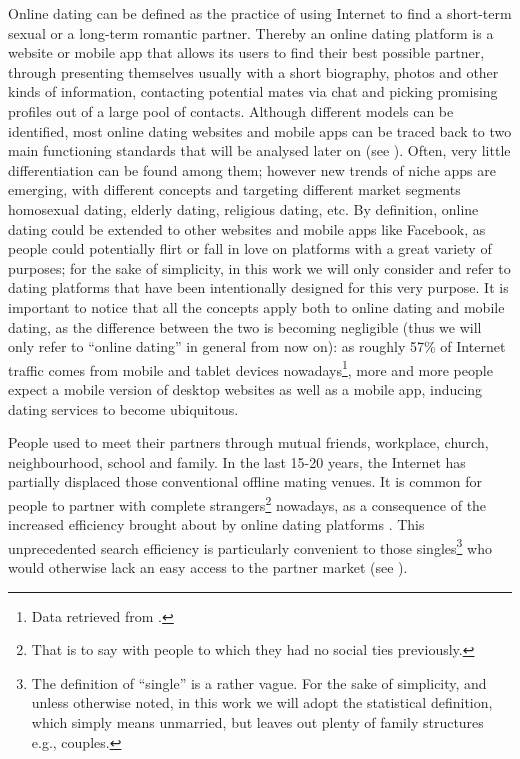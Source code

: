 Online dating can be defined as the practice of using Internet to
find a short-term sexual or a long-term romantic partner. Thereby
an online dating platform is a website or mobile app that allows its
users to find their best possible partner, through presenting themselves
usually with a short biography, photos and other kinds of information,
contacting potential mates via chat and picking promising profiles
out of a large pool of contacts. Although different models can be
identified, most online dating websites and mobile apps can be traced
back to two main functioning standards that will be analysed later
on (see ). Often,
very little differentiation can be found among them; however new trends
of niche apps are emerging, with different concepts and targeting
different market segments \textendash{} homosexual dating, elderly
dating, religious dating, etc. By definition, online dating could
be extended to other websites and mobile apps like Facebook, as people
could potentially flirt or fall in love on platforms with a great
variety of purposes; for the sake of simplicity, in this work we will
only consider and refer to dating platforms that have been intentionally
designed for this very purpose. It is important to notice that all
the concepts apply both to online dating and mobile dating, as the
difference between the two is becoming negligible (thus we will only
refer to \textquotedblleft online dating\textquotedblright{} in general
from now on): as roughly 57\% of Internet traffic comes from mobile
and tablet devices nowadays\footnote{Data retrieved from \citet{BrightEdge201757-of-Search-Tr}.},
more and more people expect a mobile version of desktop websites as
well as a mobile app, inducing dating services to become ubiquitous.

People used to meet their partners through mutual friends, workplace,
church, neighbourhood, school and family. In the last 15-20 years,
the Internet has partially displaced those conventional offline mating
venues. It is common for people to partner with complete strangers\footnote{That is to say with people to which they had no social ties previously. }
nowadays, as a consequence of the increased efficiency brought about
by online dating platforms \citep{Michael-J.-Rosenfeld2012Searching-for-a}.
This unprecedented search efficiency is particularly convenient to
those singles\footnote{The definition of \textquotedblleft single\textquotedblright{} is
a rather vague. For the sake of simplicity, and unless otherwise noted,
in this work we will adopt the statistical definition, which simply
means unmarried, but leaves out plenty of family structures \textendash{}
e.g., couples.} who would otherwise lack an easy access to the partner market (see
).

